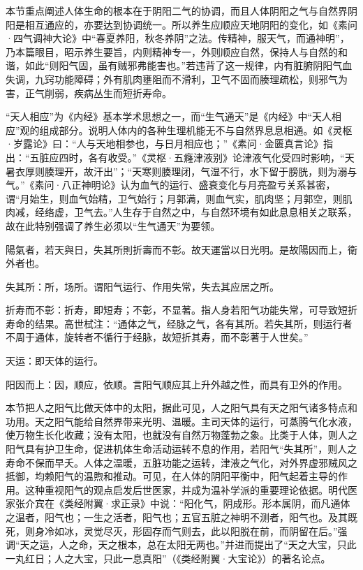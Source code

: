 \documentclass[draft,12pt]{ctexbook}
\begin{document}


本节重点阐述人体生命的根本在于阴阳二气的协调，而且人体阴阳之气与自然界阴阳是相互通应的，亦要达到协调统一。所以养生应顺应天地阴阳的变化，如《素问·四气调神大论》中“春夏养阳，秋冬养阴”之法。传精神，服天气，而通神明”，乃本篇眼目，昭示养生要旨，内则精神专一，外则顺应自然，保持人与自然的和谐，如此“则阳气固，虽有贼邪弗能害也。”若违背了这一规律，内有脏腑阴阳气血失调，九窍功能障碍；外有肌肉壅阻而不滑利，卫气不固而腠理疏松，则邪气为害，正气削弱，疾病丛生而短折寿命。

“天人相应”为《内经》基本学术思想之一，而“生气通天”是《内经》中“天人相应”观的组成部分。说明人体内的各种生理机能无不与自然界息息相通。如《灵枢·岁露论》曰：“人与天地相参也，与日月相应也；”《素问·金匮真言论》指出：“五脏应四时，各有收受。”《灵枢·五癃津液别》论津液气化受四时影响，“天暑衣厚则腠理开，故汗出”；“天寒则腠理闭，气湿不行，水下留于膀胱，则为溺与气。”《素问·八正神明论》认为血气的运行、盛衰变化与月亮盈亏关系甚密，谓“月始生，则血气始精，卫气始行；月郭满，则血气实，肌肉坚；月郭空，则肌肉减，经络虚，卫气去。”人生存于自然之中，与自然环境有如此息息相关之联系，故在此特别强调了养生必须以“生气通天”为要领。


\begin{yuanwen}
陽氣者，若天與日，失其所則折壽而不彰。故天運當以日光明。是故陽因而上，衛外者也。
\end{yuanwen}


\begin{jiaozhu}
	\item 失其所：所，场所。谓阳气运行、作用失常，失去其应居之所。
	\item 折寿而不彰：折寿，即短寿；不彰，不显著。指人身若阳气功能失常，可导致短折寿命的结果。高世栻注：“通体之气，经脉之气，各有其所。若失其所，则运行者不周于通体，旋转者不循行于经脉，故短折其寿，而不彰著于人世矣。”
	\item 天运：即天体的运行。
	\item 阳因而上：因，顺应，依顺。言阳气顺应其上升外越之性，而具有卫外的作用。
\end{jiaozhu}



本节把人之阳气比做天体中的太阳，据此可见，人之阳气具有天之阳气诸多特点和功用。天之阳气能给自然界带来光明、温暖。主司天体的运行，可蒸腾气化水液，使万物生长化收藏；没有太阳，也就没有自然万物蓬勃之象。比类于人体，则人之阳气具有护卫生命，促进机体生命活动运转不息的作用，若阳气“失其所”，则人之寿命不保而早夭。人体之温暖，五脏功能之运转，津液之气化，对外界虚邪贼风之抵御，均赖阳气的温煦和推动。可见，在人体的阴阳平衡中，阳气起着主导的作用。这种重视阳气的观点启发后世医家，并成为温补学派的重要理论依据。明代医家张介宾在《类经附翼·求正录》中说：“阳化气，阴成形。形本属阴，而凡通体之温者，阳气也；一生之活者，阳气也；五官五脏之神明不测者，阳气也。及其既死，则身冷如冰，灵觉尽灭，形固存而气则去，此以阳脱在前，而阴留在后。”强调“天之运，人之命，天之根本，总在太阳无两也。”并进而提出了“天之大宝，只此一丸红日；人之大宝，只此一息真阳”（《类经附翼·大宝论》）的著名论点。
\end{document}
